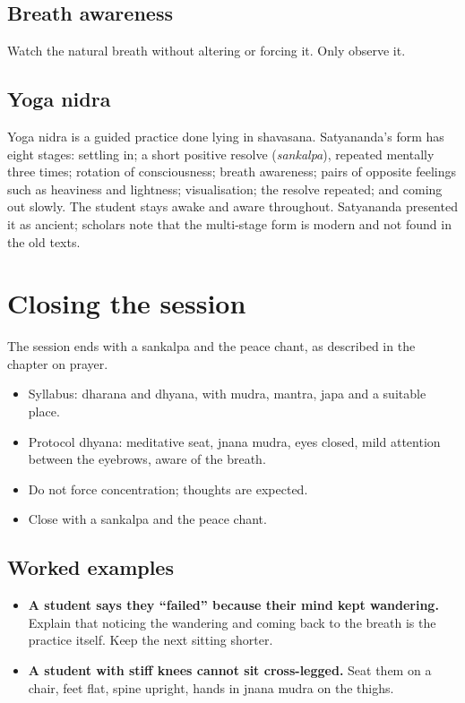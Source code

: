 \subsection*{Breath awareness}
Watch the natural breath without altering or forcing it. Only observe it.

\subsection*{Yoga nidra}
Yoga nidra is a guided practice done lying in shavasana. Satyananda's form has eight stages: settling in; a short positive resolve (\emph{sankalpa}), repeated mentally three times; rotation of consciousness; breath awareness; pairs of opposite feelings such as heaviness and lightness; visualisation; the resolve repeated; and coming out slowly. The student stays awake and aware throughout. Satyananda presented it as ancient; scholars note that the multi-stage form is modern and not found in the old texts.

\section{Closing the session}

The session ends with a sankalpa and the peace chant, as described in the chapter on prayer.

\begin{recall}
\begin{itemize}
\item Syllabus: dharana and dhyana, with mudra, mantra, japa and a suitable place.
\item Protocol dhyana: meditative seat, jnana mudra, eyes closed, mild attention between the eyebrows, aware of the breath.
\item Do not force concentration; thoughts are expected.
\item Close with a sankalpa and the peace chant.
\end{itemize}
\end{recall}

\subsection*{Worked examples}
\begin{itemize}
\item \textbf{A student says they ``failed'' because their mind kept wandering.} Explain that noticing the wandering and coming back to the breath is the practice itself. Keep the next sitting shorter.
\item \textbf{A student with stiff knees cannot sit cross-legged.} Seat them on a chair, feet flat, spine upright, hands in jnana mudra on the thighs.
\end{itemize}

